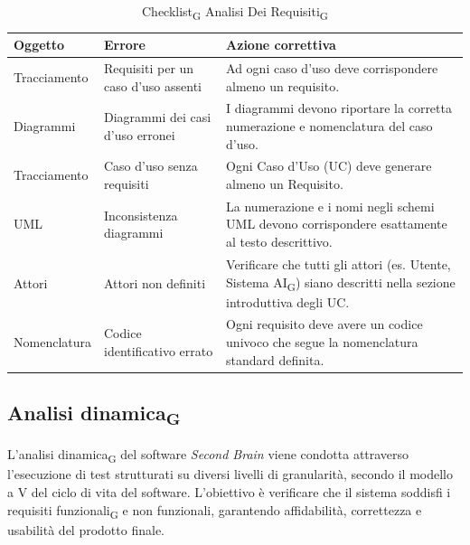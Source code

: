 \documentclass[11pt,a4paper]{article}
\newcommand{\gls}[1]{#1\textsubscript{G}}
\begin{document}
\begin{table}[H]
    \centering
    \renewcommand{\arraystretch}{1.4}
    \begin{tabular}{|l|>{\raggedright\arraybackslash}p{}|>{\raggedright\arraybackslash}p{}|}
        \hline
        \textbf{Oggetto} & \textbf{Errore} & \textbf{Azione correttiva} \\
        \hline
        Tracciamento & Requisiti per un caso d'uso assenti & Ad ogni caso d'uso deve corrispondere almeno un requisito. \\
        \hline
        Diagrammi & Diagrammi dei casi d'uso erronei & I diagrammi devono riportare la corretta numerazione e nomenclatura del caso d'uso. \\
        \hline
        Tracciamento & Caso d'uso senza requisiti & Ogni Caso d'Uso (UC) deve generare almeno un Requisito. \\
        \hline
        UML & Inconsistenza diagrammi & La numerazione e i nomi negli schemi UML devono corrispondere esattamente al testo descrittivo. \\
        \hline
        Attori & Attori non definiti & Verificare che tutti gli attori (es. Utente, \gls{Sistema AI}) siano descritti nella sezione introduttiva degli UC. \\
        \hline
        Nomenclatura & Codice identificativo errato & Ogni requisito deve avere un codice univoco che segue la nomenclatura standard definita. \\
        \hline
    \end{tabular}
    \caption{\gls{Checklist} \gls{Analisi Dei Requisiti}}
\end{table}




\newpage
\subsection{\gls{Analisi dinamica}}
L'\gls{analisi dinamica} del software \textit{Second Brain} viene condotta attraverso l'esecuzione di test strutturati su diversi livelli di granularità, secondo il modello a V del ciclo di vita del software. L'obiettivo è verificare che il sistema soddisfi i \gls{requisiti funzionali} e non funzionali, garantendo affidabilità, correttezza e usabilità del prodotto finale.
\end{document}
